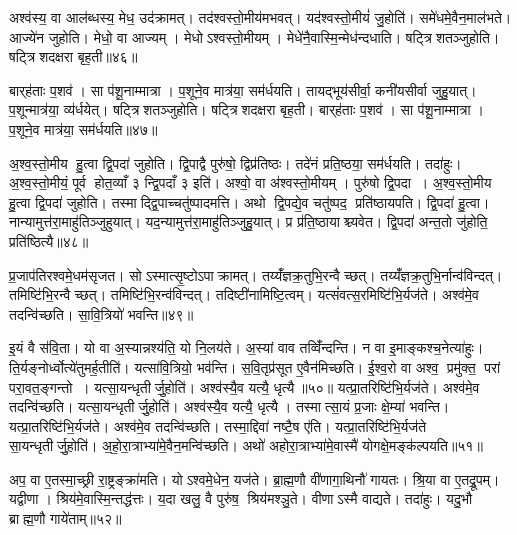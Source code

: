 अश्व॑स्य॒ वा आल॑ब्धस्य॒ मेध॒ उद॑क्रामत्। तद॑श्वस्तो॒मीय॑मभवत्। यद॑श्वस्तो॒मीयं॑ जु॒होति॑। समे॑धमे॒वैन॒माल॑भते। आज्ये॑न जुहोति। मेधो॒ वा आज्यम्। मेधोऽश्वस्तो॒मीयम्। मेधे॑नै॒वास्मि॒न्मेध॑न्दधाति। षट्त्रिशतञ्जुहोति। षट्त्रिशदक्षरा बृह॒ती॥४६॥

बार्‌ह॑ताः प॒शव॑। सा प॑शू॒नाम्मात्रा। प॒शूने॒व मात्र॑या॒ सम॑र्धयति। तायद्भूय॑सीर्वा॒ कनी॑यसीर्वा जुहु॒यात्। प॒शून्मात्र॑या॒ व्य॑र्धयेत्। षट्त्रिशतञ्जुहोति। षट्त्रिशदक्षरा बृह॒ती। बार्‌ह॑ताः प॒शव॑। सा प॑शू॒नाम्मात्रा। प॒शूने॒व मात्र॑या॒ सम॑र्धयति॥४७॥

अ॒श्व॒स्तो॒मीय हु॒त्वा द्वि॒पदा॑ जुहोति। द्वि॒पाद्वै पुरु॑षो॒ द्विप्र॑तिष्ठः। तदे॑नं प्रति॒ष्ठया॒ सम॑र्धयति। तदा॑हुः। अ॒श्व॒स्तो॒मीयं॒ पूर्व होत॒व्याँ ३ न्द्वि॒पदाँ ३ इति॑। अश्वो॒ वा अ॑श्वस्तो॒मीयम्। पुरु॑षो द्वि॒पदा। अ॒श्व॒स्तो॒मीय हु॒त्वा द्वि॒पदा॑ जुहोति। तस्माद्द्वि॒पाच्चतु॑ष्पादमत्ति। अथो द्वि॒पद्ये॒व चतु॑ष्पद॒ प्रति॑ष्ठायपति। द्वि॒पदा॑ हु॒त्वा। नान्यामुत्त॑रा॒माहु॑तिञ्जुहुयात्। यद॒न्यामुत्त॑रा॒माहु॑तिञ्जुहु॒यात्। प्र प्र॑ति॒ष्ठायाश्च्यवेत। द्वि॒पदा॑ अन्त॒तो जु॑होति॒ प्रति॑ष्ठित्यै॥४८॥

प्र॒जाप॑तिरश्वमे॒धम॑सृजत। सोऽस्मात्सृ॒ष्टोऽपाक्रामत्। तय्यँ॑ज्ञक्र॒तुभि॒रन्वैच्छत्। तय्यँ॑ज्ञक्र॒तुभि॒र्नान्व॑विन्दत्। तमिष्टि॑भि॒रन्वैच्छत्। तमिष्टि॑भि॒रन्व॑विन्दत्। तदिष्टी॑नामिष्टि॒त्वम्। यत्सं॑वत्स॒रमिष्टि॑भि॒र्यज॑ते। अश्व॑मे॒व तदन्वि॑च्छति। सा॒वि॒त्रियो॑ भवन्ति॥४९॥

इ॒यं वै स॑वि॒ता। यो वा अ॒स्यान्नश्य॑ति॒ यो नि॒लय॑ते। अ॒स्यां वाव तव्विँ॑न्दन्ति। न वा इ॒माङ्कश्च॒नेत्या॑हुः। ति॒र्यङ्नोर्ध्वोत्ये॑तुमर्ह॒तीति॑। यत्सा॑वि॒त्रियो॒ भव॑न्ति। स॒वि॒तृप्र॑सूत ए॒वैन॑मिच्छति। ई॒श्व॒रो वा अश्व॒ प्रमु॑क्त॒ परां परा॒वत॒ङ्गन्तो। यत्सा॒यन्धृतीर्जु॒होति॑। अश्व॑स्यै॒व यत्यै॒ धृत्यै॥५०॥ यत्प्रा॒तरिष्टि॑भि॒र्यज॑ते। अश्व॑मे॒व तदन्वि॑च्छति। यत्सा॒यन्धृतीर्जु॒होति॑। अश्व॑स्यै॒व यत्यै॒ धृत्यै। तस्मात्सा॒यं प्र॒जाः क्षे॒म्या॑ भवन्ति। यत्प्रा॒तरिष्टि॑भि॒र्यज॑ते। अश्व॑मे॒व तदन्वि॑च्छति। तस्मा॒द्दिवा॑ नष्टै॒ष ए॑ति। यत्प्रा॒तरिष्टि॑भि॒र्यज॑ते सा॒यन्धृतीर्जु॒होति॑। अ॒हो॒रा॒त्राभ्या॑मे॒वैन॒मन्वि॑च्छति। अथो॑ अहोरा॒त्राभ्या॑मे॒वास्मै॑ योगक्षे॒मङ्क॑ल्पयति॥५१॥\anuvakamend[भ॒व॒न्ति॒ धृत्या॑ एन॒मन्वि॑च्छ॒त्येकं च]

अप॒ वा ए॒तस्मा॒च्छ्री रा॒ष्ट्रङ्क्रा॑मति। योऽश्वमे॒धेन॒ यज॑ते। ब्रा॒ह्म॒णौ वी॑णागा॒थिनौ॑ गायतः। श्रि॒या वा ए॒तद्रू॒पम्। यद्वीणा। श्रिय॑मे॒वास्मि॒न्तद्ध॑त्तः। य॒दा खलु॒ वै पुरु॑ष॒ श्रिय॑मश्ञु॒ते। वीणाऽस्मै वाद्यते। तदा॑हुः। यदु॒भौ ब्राह्म॒णौ गाये॑ताम्॥५२॥

